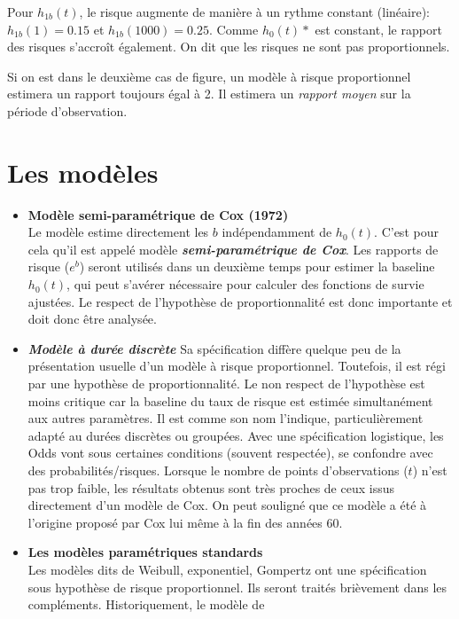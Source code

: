 \documentclass[
  12pt,
  letterpaper,
  DIV=11,
  numbers=noendperiod,
  onepage,
  openany]{scrreprt}
\begin{document}
Pour \(h_{1b}(t)\), le risque augmente de manière à un rythme constant
(linéaire): \(h_{1b}(1)=0.15\) et \(h_{1b}(1000)=0.25\). Comme
\(h_0(t)*\) est constant, le rapport des risques s'accroît également. On
dit que les risques ne sont pas proportionnels.

Si on est dans le deuxième cas de figure, un modèle à risque
proportionnel estimera un rapport toujours égal à 2. Il estimera un
\emph{rapport moyen} sur la période d'observation.

\hypertarget{les-moduxe8les}{%
\chapter{Les modèles}\label{les-moduxe8les}}

\begin{itemize}
\item
  \textbf{Modèle semi-paramétrique de Cox (1972)}\\
  Le modèle estime directement les \(b\) indépendamment de \(h_0(t)\).
  C'est pour cela qu'il est appelé modèle
  \textbf{\emph{semi-paramétrique de Cox}}. Les rapports de risque
  (\(e^{b}\)) seront utilisés dans un deuxième temps pour estimer la
  baseline \(h_0(t)\), qui peut s'avérer nécessaire pour calculer des
  fonctions de survie ajustées. Le respect de l'hypothèse de
  proportionnalité est donc importante et doit donc être analysée.
\item
  \textbf{\emph{Modèle à durée discrète}} Sa spécification diffère
  quelque peu de la présentation usuelle d'un modèle à risque
  proportionnel. Toutefois, il est régi par une hypothèse de
  proportionnalité. Le non respect de l'hypothèse est moins critique car
  la baseline du taux de risque est estimée simultanément aux autres
  paramètres. Il est comme son nom l'indique, particulièrement adapté au
  durées discrètes ou groupées. Avec une spécification logistique, les
  Odds vont sous certaines conditions (souvent respectée), se confondre
  avec des probabilités/risques. Lorsque le nombre de points
  d'observations (\(t\)) n'est pas trop faible, les résultats obtenus
  sont très proches de ceux issus directement d'un modèle de Cox. On
  peut souligné que ce modèle a été à l'origine proposé par Cox lui même
  à la fin des années 60.
\item
  \textbf{Les modèles paramétriques standards}\\
  Les modèles dits de Weibull, exponentiel, Gompertz ont une
  spécification sous hypothèse de risque proportionnel. Ils seront
  traités brièvement dans les compléments. Historiquement, le modèle de

\end{itemize}
\end{document}
